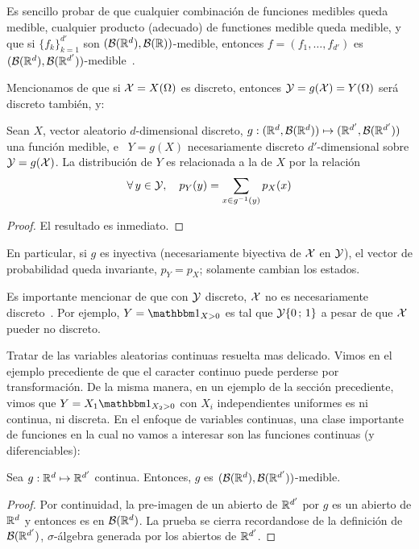 Es sencillo  probar de que  cualquier combinaci\'on de funciones  medibles queda
medible, cualquier  producto (adecuado) de  functiones medible queda  medible, y
que si $\{ f_k \}_{k=1}^{d'}$ son $(\mathcal{B}(\mathbb{R}^d),\mathcal{B}(\mathbb{R}))$-medible, entonces $f
=          (f_1         ,          \ldots         ,          f_{d'})$         es
$(\mathcal{B}(\mathbb{R}^d),\mathcal{B}(\mathbb{R}^{d'}))$-medible~\cite{AthLah06}.



Mencionamos  de que si  $\mathcal{X} =  X(\Omega)$ es  discreto, entonces  $\mathcal{Y} =  g(\mathcal{X}) =
Y(\Omega)$ ser\'a discreto tambi\'en, y:
%
\begin{teorema}
  Sean   $X$,   vector  aleatorio   $d$-dimensional   discreto,  $g:(\mathbb{R}^d   ,
  \mathcal{B}(\mathbb{R}^d)) \mapsto (\mathbb{R}^{d'} , \mathcal{B}(\mathbb{R}^{d'}))$ una funci\'on medible, e \
  $Y =  g(X)$ necesariamente discreto  $d'$-dimensional sobre $\mathcal{Y} =  g(\mathcal{X})$.  La
  distribuci\'on de $Y$ es relacionada a la de $X$ por la relaci\'on
  \[
  \forall \, y \in \mathcal{Y}, \quad p_Y(y) = \sum_{x \in g^{-1}(y)} p_X(x)
  \]
\end{teorema}
%
\begin{proof}
El resultado es inmediato.
\end{proof}
%
\noindent En particular,  si $g$ es inyectiva (necesariamente  biyectiva de $\mathcal{X}$
en $\mathcal{Y}$),  el vector  de probabilidad queda  invariante, $p_Y =  p_X$; solamente
cambian los estados.

Es  importante mencionar de  que con  $\mathcal{Y}$ discreto,  $\mathcal{X}$ no  es necesariamente
discreto~\cite{AthLah06}. Por ejemplo, $Y = \un_{X>0}$  es tal que $\mathcal{Y} \{ 0 \, ;
\, 1 \}$ a pesar de que $\mathcal{X}$ pueder no discreto.

Tratar de las variables aleatorias  continuas resuelta mas delicado. Vimos en el
ejemplo   precediente  de   que  el   caracter  continuo   puede   perderse  por
transformaci\'on. De la misma manera, en un ejemplo de la secci\'on precediente,
vimos  que  $Y =  X_1  \un_{X_2>0}$ con  $X_i$  independientes  uniformes es  ni
continua,  ni  discreta.  En  el  enfoque  de  variables  continuas,  una  clase
importante  de funciones  en la  cual  no vamos  a interesar  son las  funciones
continuas (y diferenciables):
%
\begin{lema}
  Sea   $g:   \mathbb{R}^d   \mapsto   \mathbb{R}^{d'}$   continua.   Entonces,   $g$   es
  $(\mathcal{B}(\mathbb{R}^d),\mathcal{B}(\mathbb{R}^{d'}))$-medible.
\end{lema}
%
\begin{proof}
  Por continuidad,  la pre-imagen de  un abierto de  $\mathbb{R}^{d'}$ por $g$  es un
  abierto  de $\mathbb{R}^d$  y entonces  es en  $\mathcal{B}(\mathbb{R}^d)$. La  prueba  se cierra
  recordandose  de  la   definici\'on  de  $\mathcal{B}(\mathbb{R}^{d'})$,  $\sigma$-\'algebra
  generada por los abiertos de $\mathbb{R}^{d'}$.
\end{proof}

